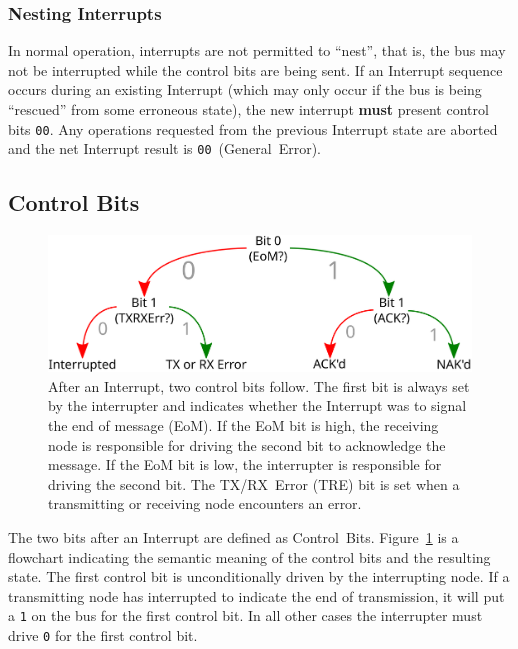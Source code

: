 \subsubsection{Nesting Interrupts}
In normal operation, interrupts are not permitted to ``nest'', that is, the
bus may not be interrupted while the control bits are being sent. If an
Interrupt sequence occurs during an existing Interrupt (which may only occur
if the bus is being ``rescued'' from some erroneous state), the new interrupt
{\bf must} present control bits {\tt 00}. Any operations requested from the
previous Interrupt state are aborted and the net Interrupt result is
{\tt 00}~(General~Error).

\subsection{Control Bits}
\label{sec:protocol-control}

\begin{figure}
  \includegraphics[width=\linewidth]{img/control_bits}
  \caption{After an Interrupt, two control bits follow. The first bit is
    always set by the interrupter and indicates whether the Interrupt was to
    signal the end of message (EoM). If the EoM bit is high, the receiving
    node is responsible for driving the second bit to acknowledge the message.
    If the EoM bit is low, the interrupter is responsible for driving the
    second bit. The TX/RX~Error (TRE) bit is set when a transmitting or
    receiving node encounters an error.
  }
  \label{fig:control-bits}
\end{figure}

The two bits after an Interrupt are defined as Control~Bits.
Figure~\ref{fig:control-bits} is a flowchart indicating the semantic meaning
of the control bits and the resulting state. The first control bit is
unconditionally driven by the interrupting node. If a transmitting node has
interrupted to indicate the end of transmission, it will put a {\tt 1} on the
bus for the first control bit. In all other cases the interrupter must drive
{\tt 0} for the first control bit.

